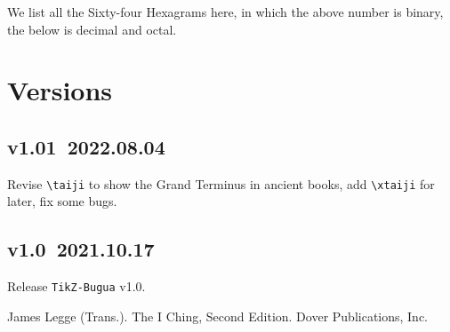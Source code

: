 \documentclass{article}
\begin{document}
We list all the Sixty-four Hexagrams here, in which the above number is binary, the below is decimal and octal.

\begin{center}
\end{center}

\section{Versions}
\subsection*{v1.01~2022.08.04}
Revise \verb+\taiji+ to show the Grand Terminus in ancient books, add \verb+\xtaiji+ for later, fix some bugs.

\subsection*{v1.0~2021.10.17}
Release \verb+TikZ-Bugua+ v1.0.

\begin{thebibliography}{9}
     James Legge (Trans.). The I Ching, Second Edition. Dover Publications, Inc.
\end{thebibliography}

\printindex
\end{document}
